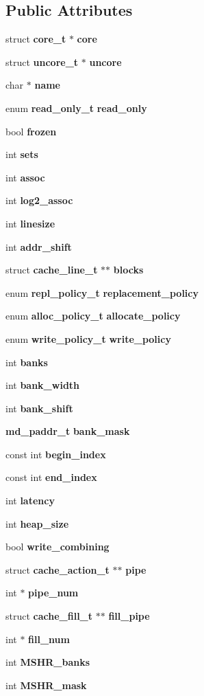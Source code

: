 \subsection*{Public Attributes}
\begin{CompactItemize}
\item 
struct {\bf core\_\-t} $\ast$ {\bf core}
\item 
struct {\bf uncore\_\-t} $\ast$ {\bf uncore}
\item 
char $\ast$ {\bf name}
\item 
enum {\bf read\_\-only\_\-t} {\bf read\_\-only}
\item 
bool {\bf frozen}
\item 
int {\bf sets}
\item 
int {\bf assoc}
\item 
int {\bf log2\_\-assoc}
\item 
int {\bf linesize}
\item 
int {\bf addr\_\-shift}
\item 
struct {\bf cache\_\-line\_\-t} $\ast$$\ast$ {\bf blocks}
\item 
enum {\bf repl\_\-policy\_\-t} {\bf replacement\_\-policy}
\item 
enum {\bf alloc\_\-policy\_\-t} {\bf allocate\_\-policy}
\item 
enum {\bf write\_\-policy\_\-t} {\bf write\_\-policy}
\item 
int {\bf banks}
\item 
int {\bf bank\_\-width}
\item 
int {\bf bank\_\-shift}
\item 
{\bf md\_\-paddr\_\-t} {\bf bank\_\-mask}
\item 
const int {\bf begin\_\-index}
\item 
const int {\bf end\_\-index}
\item 
int {\bf latency}
\item 
int {\bf heap\_\-size}
\item 
bool {\bf write\_\-combining}
\item 
struct {\bf cache\_\-action\_\-t} $\ast$$\ast$ {\bf pipe}
\item 
int $\ast$ {\bf pipe\_\-num}
\item 
struct {\bf cache\_\-fill\_\-t} $\ast$$\ast$ {\bf fill\_\-pipe}
\item 
int $\ast$ {\bf fill\_\-num}
\item 
int {\bf MSHR\_\-banks}
\item 
int {\bf MSHR\_\-mask}
\item 
$$
\end{CompactItemize}
